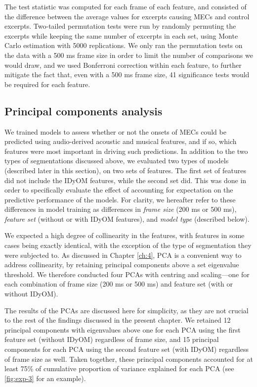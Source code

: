 The test statistic was computed for each frame of each feature, and consisted of the difference between the average values for excerpts causing MECs and control excerpts. Two-tailed permutation tests were run by randomly permuting the excerpts while keeping the same number of excerpts in each set, using Monte Carlo estimation with 5000 replications. We only ran the permutation tests on the data with a 500 ms frame size in order to limit the number of comparisons we would draw, and we used Bonferroni correction within each feature, to further mitigate the fact that, even with a 500 ms frame size, 41 significance tests would be required for each feature.

\subsection{Principal components analysis}

We trained models to assess whether or not the onsets of MECs could be predicted using audio-derived acoustic and musical features, and if so, which features were most important in driving such predictions. In addition to the two types of segmentations discussed above, we evaluated two types of models (described later in this section), on two sets of features. The first set of features did not include the IDyOM features, while the second set did. This was done in order to specifically evaluate the effect of accounting for expectation on the predictive performance of the models.  For clarity, we hereafter refer to these differences in model training as differences in \emph{frame size} (200 ms or 500 ms), \emph{feature set} (without or with IDyOM features), and \emph{model type} (described below).

We expected a high degree of collinearity in the features, with features in some cases being exactly identical, with the exception of the type of segmentation they were subjected to. As discussed in Chapter \ref{ch:4}, PCA is a convenient way to address collinearity, by retaining principal components above a set eigenvalue threshold. We therefore conducted four PCAs with centring and scaling---one for each combination of frame size (200 ms or 500 ms) and feature set (with or without IDyOM).

The results of the PCAs are discussed here for simplicity, as they are not crucial to the rest of the findings discussed in the present chapter. We retained 12 principal components with eigenvalues above one for each PCA using the first feature set (without IDyOM) regardless of frame size, and 15 principal components for each PCA using the second feature set (with IDyOM) regardless of frame size as well. Taken together, these principal components accounted for at least 75\% of cumulative proportion of variance explained for each PCA (see \autoref{fig:exp-3} for an example).

